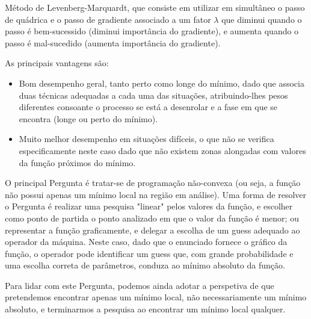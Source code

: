 Método de Levenberg-Marquardt, que consiste em utilizar em simultâneo o passo de quádrica e o passo de gradiente associado a um fator $\lambda$ que diminui quando o passo é bem-sucessido (diminui importância do gradiente), e aumenta quando o passo é mal-sucedido (aumenta importância do gradiente).

As principais vantagens são:
\begin{itemize}
    \item Bom desempenho geral, tanto perto como longe do mínimo, dado que associa duas técnicas adequadas a cada uma das situações, atribuindo-lhes pesos diferentes consoante o processo se está a desenrolar e a fase em que se encontra (longe ou perto do mínimo).
    \item Muito melhor desempenho em situações difíceis, o que não se verifica especificamente neste caso dado que não existem zonas alongadas com valores da função próximos do mínimo.
\end{itemize}

O principal Pergunta é tratar-se de programação não-convexa (ou seja, a função não possui apenas um mínimo local na região em análise). Uma forma de resolver o Pergunta é realizar uma pesquisa "linear" pelos valores da função, e escolher como ponto de partida o ponto analizado em que o valor da função é menor; ou representar a função graficamente, e delegar a escolha de um guess adequado ao operador da máquina. Neste caso, dado que o enunciado fornece o gráfico da função, o operador pode identificar um guess que, com grande probabilidade e uma escolha correta de parâmetros, conduza ao mínimo absoluto da função.\par
Para lidar com este Pergunta, podemos ainda adotar a perspetiva de que pretendemos encontrar apenas um mínimo local, não necessariamente um mínimo absoluto, e terminarmos a pesquisa ao encontrar um mínimo local qualquer.

\newpage


